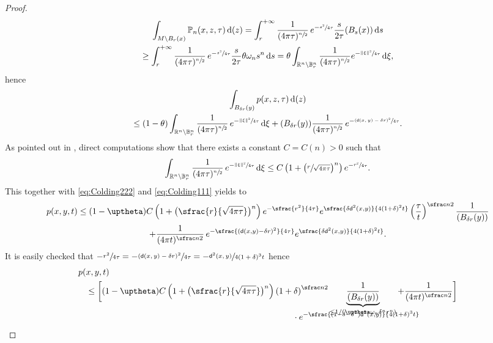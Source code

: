 \documentclass[JEP,XML,SOM,Unicode,published]{cedram}
\newcommand{\NoChangel}[1]{%
\expandafter\let\csname old\string#1\endcsname=#1
\let#1=\relax
\newcommand{#1}{\mathcode`l="716C\csname old\string#1\endcsname\mathcode`l="7160 }%
}
\theoremstyle{plain}
\theoremstyle{definition}
\newcommand{\setR}{\mathbb{R}}
\newcommand{\bP}{\mathbb{P}}
\newcommand{\setB}{\mathbb{B}}
\newcommand{\di}{\mathop{}\!\mathrm{d}}
\newcommand{\dist}{\mathsf{d}}
\DeclareMathOperator{\vol}{vol}\NoChangel{\vol}
\begin{document}
\begin{proof}
\begin{multline*}
\int_{M\setminus B_r(x)}\bP_n(x,z,\tau)\di \vol(z) =\int_{r}^{+\infty} \frac{1}{(4\pi \tau)^{\sfrac n2}}\,e^{-\sfrac{s^2}{4\tau}}\frac{s}{2\tau}\vol(B_s(x))\di s\\
\ge \int_{r}^{+\infty} \frac{1}{(4\pi \tau)^{\sfrac n2}}\,e^{-\sfrac{s^2}{4\tau}}\frac{s}{2\tau} \theta \omega_n s^n \di s = \theta \int_{\setR^n\setminus \setB_r^n}\frac{1}{(4\pi \tau)^{\sfrac n2}}e^{-\sfrac{\|\xi\|^2}{4\tau}}\di \xi,
\end{multline*}
hence
\begin{multline}\label{eq:Colding222}
\int_{B_{\delta r}(y)}p(x,z,\tau)\di \vol(z)\\
\le (1-\theta)\int_{\setR^n\setminus \setB_r^n}\frac{1}{(4\pi \tau)^{\sfrac n2}}\,e^{-\sfrac{\|\xi\|^2}{4\tau}}\di \xi +\vol(B_{\delta r}(y)) \frac{1}{(4\pi \tau)^{\sfrac n2}}\,e^{-\sfrac{(\dist(x,y)-\delta r)^2}{4\tau}}.
\end{multline}
As pointed out in \cite[Form.\,(2.6)]{LiTamWang}, direct computations show that there exists a constant $C=C(n)>0$ such that
\[
\int_{\setR^n\setminus \setB_r^n}\frac{1}{(4\pi \tau)^{\sfrac n2}}\,e^{-\sfrac{\|\xi\|^2}{4\tau}}\di \xi \le C\left(1+\bigl(\sfrac{r}{\sqrt{4\pi\tau}}\bigr)^n\right)e^{-\sfrac{r^2}{4\tau}}.
\]
This together with \eqref{eq:Colding222} and \eqref{eq:Colding111} yields to
\begin{multline*}
p(x,y,t)\le (1-\uptheta) C\left(1+\bigl(\sfrac{r}{\sqrt{4\pi\tau}}\bigr)^n\right)e^{-\sfrac{r^2}{4\tau}}e^{\sfrac{\delta \dist^2(x,y)}{4(1+\delta)^2t}} \left(\frac{\tau}{t}\right)^{\sfrac n2}\frac{1}{\vol (B_{\delta r}(y))}\\
+\frac{1}{(4\pi t)^{\sfrac n2}}\,e^{-\sfrac{(\dist(x,y)-\delta r)^2}{4\tau}}e^{\sfrac{\delta \dist^2(x,y)}{4(1+\delta)^2t}}.
\end{multline*}
It is easily checked that $
-\sfrac{r^2}{4\tau} =-\sfrac{(\dist(x,y)-\delta r)^2}{4\tau} = - \sfrac{\dist^2(x,y)}{4(1+\delta)^3 t}$
hence
\begin{align*}
p(&x,y,t)\\
&\le\biggl[(1-\uptheta) C\left(1+\bigl(\sfrac{r}{\sqrt{4\pi\tau}} \bigr)^n \right)\left(1+\delta\right)^{\sfrac n2}\underbrace{\frac{1}{\vol (B_{\delta r}(y))}}_{\le 1/(\uptheta \omega_n \delta^n r^n)}+\frac{1}{(4\pi t)^{\sfrac n2}}\biggr]\\[-10pt]
&\hspace*{8.5cm}\cdot e^{-\sfrac{(1-\delta-\delta^2)\dist^2(x,y)}{4(1+\delta)^3t}}\\

\end{align*}
\end{proof}
\end{document}
